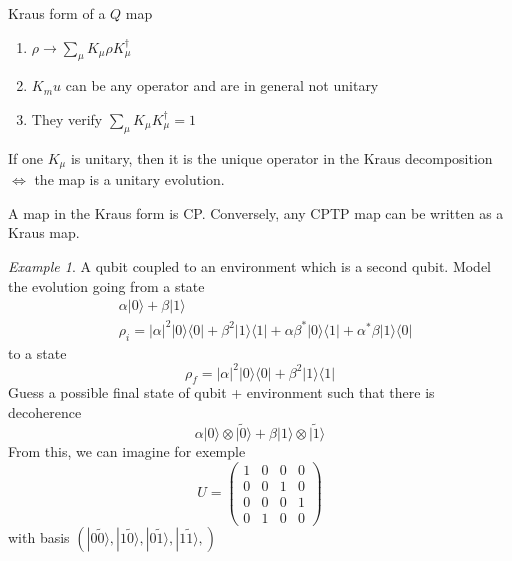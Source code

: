 \documentclass[a4paper]{book}
\theoremstyle{definition}
\theoremstyle{remark}
\newtheorem*{example}{Example}
\begin{document}
Kraus form of a $Q$ map
\begin{enumerate}
    \item $\rho \rightarrow \sum_\mu K_\mu \rho K^\dagger_\mu$
    \item $K_mu$ can be any operator and are in general not unitary 
    \item They verify $\sum_\mu K_\mu K^\dagger_\mu = 1$
\end{enumerate}
If one $K_\mu$ is unitary, then it is the unique operator in the Kraus decomposition $\Leftrightarrow$ the map is a unitary evolution. \par \medskip 

A map in the Kraus form is CP. Conversely, any CPTP map can be written as a Kraus map. \par 

\begin{example}
    A qubit coupled to an environment which is a second qubit. Model the evolution going from a state
    \begin{equation}
        \begin{aligned}
            &\alpha |0\rangle + \beta |1\rangle \\
            &\rho_i = |\alpha|^2 |0\rangle\langle 0| + \beta^2 |1\rangle\langle 1| + \alpha \beta^* |0\rangle \langle 1 | + \alpha^*\beta |1\rangle\langle 0|
        \end{aligned}
    \end{equation}
    to a state 
    \begin{equation}
        \rho_f = |\alpha|^2 |0\rangle\langle 0| + \beta^2 |1\rangle\langle 1|
    \end{equation}
    Guess a possible final state of qubit + environment such that there is decoherence 
    \begin{equation}
        \alpha |0\rangle\otimes|\tilde{0}\rangle  + \beta |1\rangle \otimes|\tilde{1}\rangle
    \end{equation}
    From this, we can imagine for exemple 
    \begin{equation}
        U = \begin{pmatrix}
            1 & 0 & 0 & 0 \\ 
            0 & 0 & 1 & 0 \\
            0 & 0 & 0 & 1 \\
            0 & 1 & 0 & 0
        \end{pmatrix}
    \end{equation}
    with basis $(|0\tilde{0}\rangle, |1\tilde{0}\rangle, |0\tilde{1}\rangle, |1\tilde{1}\rangle, )$ \par 

\end{example}
\end{document}
